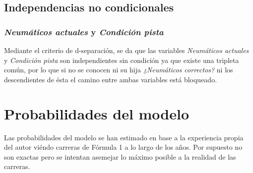 \documentclass[]{article}
\begin{document}
\subsection{Independencias no condicionales}
\subsubsection{\textit{Neumáticos actuales} y \textit{Condición pista}}
Mediante el criterio de d-separación, se da que las variables \textit{Neumáticos actuales} y \textit{Condición pista} son independientes sin condición ya que existe una tripleta común, por lo que si no se conocen ni su hija \textit{¿Neumáticos correctos?} ni los descendientes de ésta el camino entre ambas variables está bloqueado.
\section{Probabilidades del modelo}
Las probabilidades del modelo se han estimado en base a la experiencia propia del autor viéndo carreras de Fórmula 1 a lo largo de los años. Por supuesto no son exactas pero se intentan asemejar lo máximo posible a la realidad de las carreras.
\end{document}
